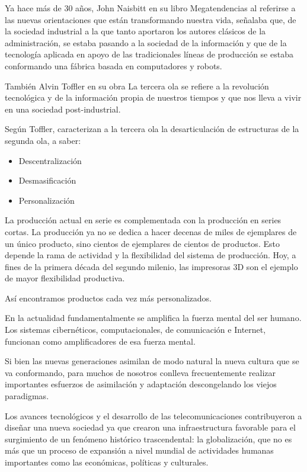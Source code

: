 \documentclass[a4paper, 12pt]{article}
\begin{document}
Ya hace más de 30 años, John Naisbitt en su libro Megatendencias \cite{Naisbitt1984} al referirse a las nuevas orientaciones que están transformando nuestra vida, señalaba que, de la sociedad industrial a la que tanto aportaron los autores clásicos de la administración, se estaba pasando a la sociedad de la información y que de la tecnología aplicada en apoyo de las tradicionales líneas de producción se estaba conformando una fábrica basada en computadores y robots.

También Alvin Toffler\cite{Toffler1997} en su obra La tercera ola se refiere a la revolución tecnológica y de la información propia de nuestros tiempos y que nos lleva a vivir en una sociedad post-industrial.

Según Toffler, caracterizan a la tercera ola la desarticulación de estructuras de la segunda ola, a saber:
\begin{itemize}
\item Descentralización
\item Desmasificación
\item Personalización
\end{itemize}

La producción actual en serie es complementada con la producción en series cortas. La producción ya no se dedica a hacer decenas de miles de ejemplares de un único producto, sino cientos de ejemplares de cientos de productos. Esto depende la rama de actividad y la flexibilidad del sistema de producción. Hoy,  a fines de la primera década del segundo milenio, las impresoras 3D son el ejemplo de mayor flexibilidad productiva.

Así encontramos productos cada vez más personalizados.

En la actualidad fundamentalmente se amplifica la fuerza mental del ser humano. Los sistemas cibernéticos, computacionales, de comunicación e Internet, funcionan como amplificadores de esa fuerza mental.

Si bien las nuevas generaciones asimilan de modo natural la nueva cultura que se va conformando, para muchos de nosotros conlleva frecuentemente realizar importantes esfuerzos de asimilación y adaptación descongelando los viejos paradigmas.

Los avances tecnológicos y el desarrollo de las telecomunicaciones contribuyeron a diseñar una nueva sociedad ya que crearon una infraestructura favorable para el surgimiento de un fenómeno histórico trascendental:  la globalización, que no es más que un proceso de expansión a nivel mundial de actividades humanas importantes como las económicas, políticas y culturales.
\end{document}
